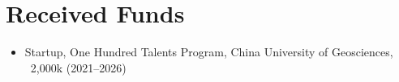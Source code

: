 \section{Received Funds}

\begin{itemize}
\item Startup, One Hundred Talents Program, China University of Geosciences, \textyen\ 2,000k (2021--2026)
\end{itemize}
